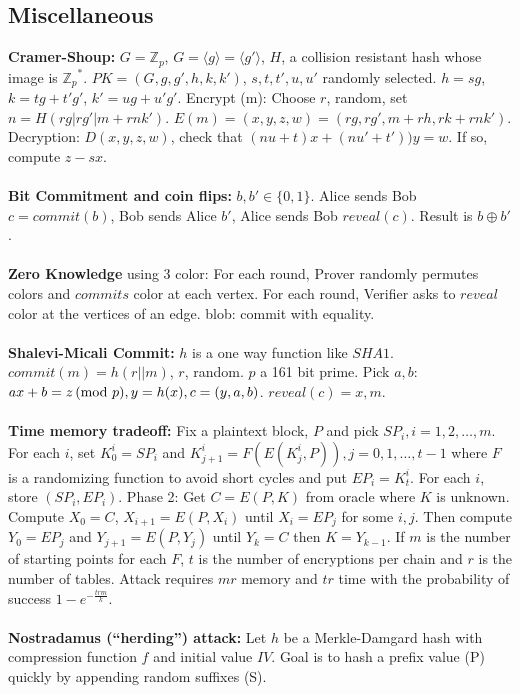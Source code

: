\subsection{Miscellaneous}
{\bf Cramer-Shoup:} $G= {\mathbb Z}_p$, $G= \langle g \rangle= \langle g' \rangle$, $H$, 
a collision resistant hash whose
image is ${{\mathbb Z}_p}^*$.  $PK= (G, g, g', h, k, k')$, $s, t, t', u, u'$ randomly
selected.  $h=sg$, $k=tg+t'g'$, $k'=ug+u'g'$.  Encrypt (m): Choose $r$,
random,
set $n= H(rg | rg' | m+rnk')$.
$E(m)= (x, y, z, w)= (rg, rg', m+rh, rk+rnk')$. Decryption: $D(x, y, z, w)$,
check that $(nu+t)x + (nu'+t'))y=w$.  If so, compute $z-sx$.
\\
\\
{\bf Bit Commitment and coin flips:} $b, b' \in \{0,1\}$. Alice sends Bob
$c=commit(b)$, Bob sends Alice $b'$, Alice sends Bob $reveal(c)$.  Result is
$b \oplus b'$.
\\
\\
{\bf Zero Knowledge} using 3 color:  For each round, Prover randomly permutes colors
and $commits$ color at each vertex.  For each round, Verifier asks to
$reveal$ color at the vertices of an edge.
blob: commit with equality.
\\
\\
{\bf Shalevi-Micali Commit:} $h$ is a one way function like $SHA1$.
$commit(m)= h(r||m)$, $r$, random.  $p$ a 161 bit prime.  Pick
$a, b$: $ax+b=z \thinspace \textnormal{(mod } p \textnormal{)}, y=h(x), c=(y,a,b)$.  $reveal(c)= x,m$.
\\
\\
{\bf Time memory tradeoff:}
Fix a plaintext block, $P$ and pick $SP_{i}, i= 1,2, \ldots, m$.
For each $i$, set $K_0^i = SP_i$ and $K_{j+1}^i= F(E(K_j^i, P)), j= 0, 1, \ldots , t-1$
where $F$ is a randomizing function to avoid short cycles and put $EP_i=K_t^i$.  
For each $i$, store $(SP_i, EP_i)$. Phase 2: Get $C=E(P, K)$ from oracle
where $K$ is unknown.  Compute
$X_0= C$, $X_{i+1}= E(P, X_i)$ until $X_i= EP_j$ for some $i, j$.
Then compute $Y_0= EP_j$ and $Y_{j+1}= E(P, Y_j)$ until $Y_k = C$ then
$K= Y_{k-1}$.  If $m$ is the number of starting points for each $F$, $t$ is the number of
encryptions per chain and $r$ is the number of tables.  Attack requires $mr$ memory
and $tr$ time with the probability of success $1- e^{-{\frac {trm} k}}$.
\\
\\
{\bf Nostradamus (``herding'') attack:}  Let $h$ be a
Merkle-Damgard hash with compression function $f$ and initial value $IV$.
Goal is to hash a prefix value (P) quickly by appending random suffixes (S).
